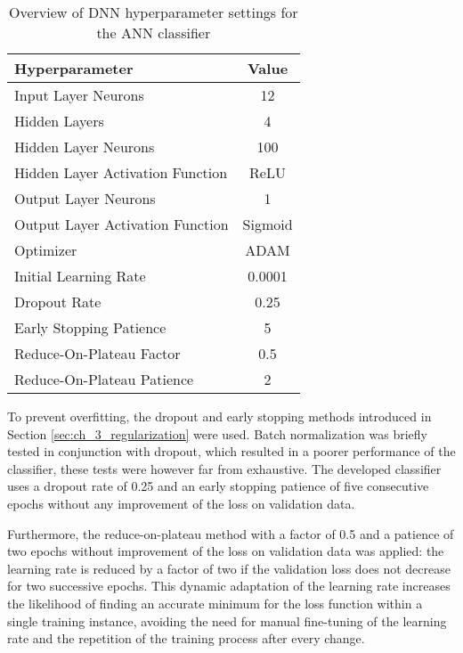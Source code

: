 \begin{table}[h]
    \caption{Overview of DNN hyperparameter settings for the ANN classifier}
    \label{tab:ch_4_ann_topology}
    \begin{center}
        \begin{tabular}{lc}
            \hline
            Hyperparameter & Value\\
            \hline
            Input Layer Neurons & 12\\
            Hidden Layers & 4\\
            Hidden Layer Neurons & 100\\
            Hidden Layer Activation Function & ReLU\\
            Output Layer Neurons & 1\\
            Output Layer Activation Function & Sigmoid\\
            Optimizer & ADAM\\
            Initial Learning Rate & 0.0001\\
            Dropout Rate & 0.25\\
            Early Stopping Patience & 5\\
            Reduce-On-Plateau Factor & 0.5\\
            Reduce-On-Plateau Patience & 2\\
            \hline
        \end{tabular}
    \end{center}
\end{table}

To prevent overfitting, the dropout and early stopping methods introduced in Section \ref{sec:ch_3_regularization} were used. Batch normalization was briefly tested in conjunction with dropout, which resulted in a poorer performance of the classifier, these tests were however far from exhaustive. The developed classifier uses a dropout rate of 0.25 and an early stopping patience of five consecutive epochs without any improvement of the loss on validation data.

Furthermore, the reduce-on-plateau method with a factor of 0.5 and a patience of two epochs without improvement of the loss on validation data was applied: the learning rate is reduced by a factor of two if the validation loss does not decrease for two successive epochs. This dynamic adaptation of the learning rate increases the likelihood of finding an accurate minimum for the loss function within a single training instance, avoiding the need for manual fine-tuning of the learning rate and the repetition of the training process after every change.

